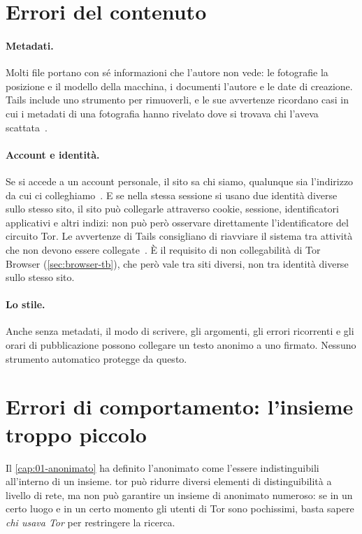 \section{Errori del contenuto}\label{sec:opsec-contenuto}

\paragraph{Metadati.} Molti file portano con sé informazioni che l'autore non vede: le fotografie la posizione e il modello della macchina, i documenti l'autore e le date di creazione. Tails include uno strumento per rimuoverli, e le sue avvertenze ricordano casi in cui i metadati di una fotografia hanno rivelato dove si trovava chi l'aveva scattata~\cite{tailswarnings}.

\paragraph{Account e identità.} Se si accede a un account personale, il sito sa chi siamo, qualunque sia l'indirizzo da cui ci colleghiamo~\cite{torsafety}. E se nella stessa sessione si usano due identità diverse sullo stesso sito, il sito può collegarle attraverso cookie, sessione, identificatori applicativi e altri indizi: non può però osservare direttamente l'identificatore del circuito Tor. Le avvertenze di Tails consigliano di riavviare il sistema tra attività che non devono essere collegate~\cite{tailswarnings}. È il requisito di non collegabilità di Tor Browser (\cref{sec:browser-tb}), che però vale tra siti diversi, non tra identità diverse sullo stesso sito.

\paragraph{Lo stile.} Anche senza metadati, il modo di scrivere, gli argomenti, gli errori ricorrenti e gli orari di pubblicazione possono collegare un testo anonimo a uno firmato. Nessuno strumento automatico protegge da questo.

\section{Errori di comportamento: l'insieme troppo piccolo}\label{sec:opsec-insieme}

Il \cref{cap:01-anonimato} ha definito l'anonimato come l'essere indistinguibili all'interno di un insieme. tor può ridurre diversi elementi di distinguibilità a livello di rete, ma non può garantire un insieme di anonimato numeroso: se in un certo luogo e in un certo momento gli utenti di Tor sono pochissimi, basta sapere \emph{chi usava Tor} per restringere la ricerca.

